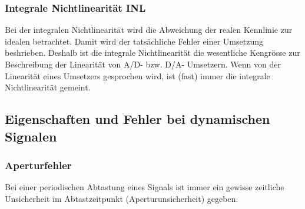 \subsubsection{Integrale Nichtlinearität INL }
Bei der integralen Nichtlinearität wird die Abweichung der realen
Kennlinie zur idealen betrachtet. Damit wird der tatsächliche Fehler einer
Umsetzung beshrieben. Deshalb ist die integrale Nichtlinearität die wesentliche
Kengrösse zur Beschreibung der Linearität von A/D- bzw. D/A- Umsetzern. Wenn
von der Linearität eines Umsetzers gesprochen wird, ist (fast) immer die
integrale Nichtlinearität gemeint.
\begin{figure}[!ht]
\begin{center}
\end{center}
\end{figure}


\subsection{Eigenschaften und Fehler bei dynamischen Signalen}
\subsubsection{Aperturfehler} 
Bei einer periodischen Abtastung eines Signals ist immer ein gewisse zeitliche
Unsicherheit im Abtastzeitpunkt (Aperturunsicherheit) gegeben.


